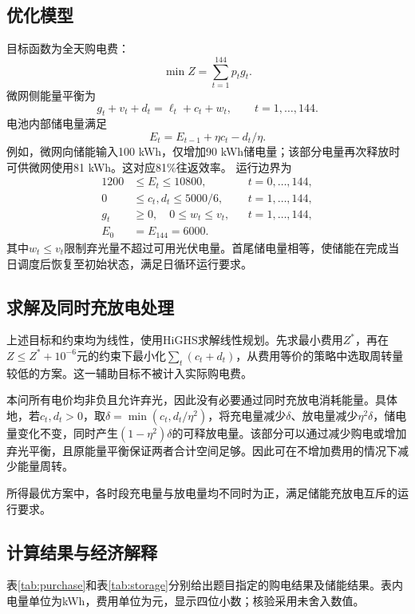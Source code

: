 \subsection{优化模型}
目标函数为全天购电费：
\begin{equation}\min Z=\sum_{t=1}^{144}p_tg_t.\end{equation}
微网侧能量平衡为
\begin{equation}g_t+v_t+d_t=\ell_t+c_t+w_t,\qquad t=1,\ldots,144.\end{equation}
电池内部储电量满足
\begin{equation}E_t=E_{t-1}+\eta c_t-d_t/\eta.\end{equation}
例如，微网向储能输入100 kWh，仅增加90 kWh储电量；该部分电量再次释放时可供微网使用81 kWh。这对应81\%往返效率。
运行边界为
\begin{align}
1200&\le E_t\le10800, &&t=0,\ldots,144,\\
0&\le c_t,d_t\le 5000/6, &&t=1,\ldots,144,\\
g_t&\ge0,\quad 0\le w_t\le v_t, &&t=1,\ldots,144,\\
E_0&=E_{144}=6000.
\end{align}
其中$w_t\le v_t$限制弃光量不超过可用光伏电量。首尾储电量相等，使储能在完成当日调度后恢复至初始状态，满足日循环运行要求。

\subsection{求解及同时充放电处理}
上述目标和约束均为线性，使用HiGHS求解线性规划。先求最小费用$Z^*$，再在$Z\le Z^*+10^{-6}$元的约束下最小化$\sum_t(c_t+d_t)$，从费用等价的策略中选取周转量较低的方案。这一辅助目标不被计入实际购电费。

本问所有电价均非负且允许弃光，因此没有必要通过同时充放电消耗能量。具体地，若$c_t,d_t>0$，取$\delta=\min(c_t,d_t/\eta^2)$，将充电量减少$\delta$、放电量减少$\eta^2\delta$，储电量变化不变，同时产生$(1-\eta^2)\delta$的可释放电量。该部分可以通过减少购电或增加弃光平衡，且原能量平衡保证两者合计空间足够。因此可在不增加费用的情况下减少能量周转。

所得最优方案中，各时段充电量与放电量均不同时为正，满足储能充放电互斥的运行要求。

\subsection{计算结果与经济解释}
表\ref{tab:purchase}和表\ref{tab:storage}分别给出题目指定的购电结果及储能结果。表内电量单位为kWh，费用单位为元，显示四位小数；核验采用未舍入数值。
\begin{table}[htbp]\centering\small
\caption{指定时段购电量与全天指标}\label{tab:purchase}

\end{table}
\begin{table}[htbp]\centering\small
\caption{各四小时时段充放电量及首尾储电量}\label{tab:storage}

\end{table}

